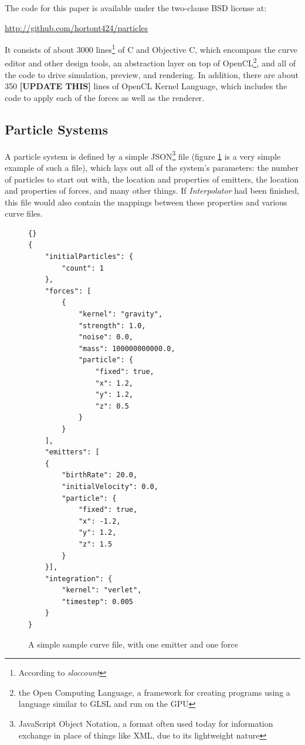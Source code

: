 \documentclass{acmsiggraph}
\begin{document}
The code for this paper is available under the two-clause BSD license at:

\url{http://github.com/hortont424/particles}

It consists of about 3000 lines\footnote{According to {\it sloccount}} of C and Objective C, which encompass the curve editor and other design tools, an abstraction layer on top of OpenCL\footnote{the Open Computing Language, a framework for creating programs using a language similar to GLSL and run on the GPU}, and all of the code to drive simulation, preview, and rendering. In addition, there are about 350 {\bf [UPDATE THIS]} lines of OpenCL Kernel Language, which includes the code to apply each of the forces as well as the renderer.

\subsection{Particle Systems}

A particle system is defined by a simple JSON\footnote{JavaScript Object Notation, a format often used today for information exchange in place of things like XML, due to its lightweight nature} file (figure \ref{curveListing} is a very simple example of such a file), which lays out all of the system's parameters: the number of particles to start out with, the location and properties of emitters, the location and properties of forces, and many other things. If {\it Interpolator} had been finished, this file would also contain the mappings between these properties and various curve files.

\begin{figure}

    \lstset{language=Python}
    \lstset{basicstyle=\footnotesize\ttfamily}
    \begin{lstlisting}[frame=trbl]{}
{
    "initialParticles": {
        "count": 1
    },
    "forces": [
        {
            "kernel": "gravity",
            "strength": 1.0,
            "noise": 0.0,
            "mass": 100000000000.0,
            "particle": {
                "fixed": true,
                "x": 1.2,
                "y": 1.2,
                "z": 0.5
            }
        }
    ],
    "emitters": [
    {
        "birthRate": 20.0,
        "initialVelocity": 0.0,
        "particle": {
            "fixed": true,
            "x": -1.2,
            "y": 1.2,
            "z": 1.5
        }
    }],
    "integration": {
        "kernel": "verlet",
        "timestep": 0.005
    }
}
    \end{lstlisting}

    \caption{A simple sample curve file, with one emitter and one force}
    \label{curveListing}
\end{figure}
\end{document}
